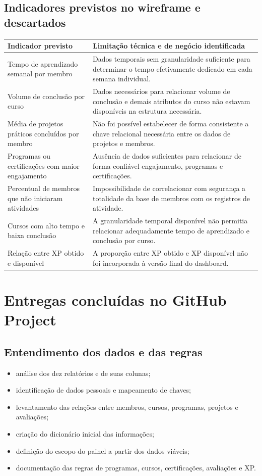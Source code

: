 \documentclass[11pt,a4paper]{article}
\begin{document}
\subsection{Indicadores previstos no wireframe e descartados}

\begin{longtable}{L{56mm}L{90mm}}
\toprule
\textbf{Indicador previsto} & \textbf{Limitação técnica e de negócio identificada} \\
\midrule
\endhead
Tempo de aprendizado semanal por membro & Dados temporais sem granularidade suficiente para determinar o tempo efetivamente dedicado em cada semana individual. \\
\addlinespace
Volume de conclusão por curso & Dados necessários para relacionar volume de conclusão e demais atributos do curso não estavam disponíveis na estrutura necessária. \\
\addlinespace
Média de projetos práticos concluídos por membro & Não foi possível estabelecer de forma consistente a chave relacional necessária entre os dados de projetos e membros. \\
\addlinespace
Programas ou certificações com maior engajamento & Ausência de dados suficientes para relacionar de forma confiável engajamento, programas e certificações. \\
\addlinespace
Percentual de membros que não iniciaram atividades & Impossibilidade de correlacionar com segurança a totalidade da base de membros com os registros de atividade. \\
\addlinespace
Cursos com alto tempo e baixa conclusão & A granularidade temporal disponível não permitia relacionar adequadamente tempo de aprendizado e conclusão por curso. \\
\addlinespace
Relação entre XP obtido e disponível & A proporção entre XP obtido e XP disponível não foi incorporada à versão final do dashboard. \\
\bottomrule
\end{longtable}

\section{Entregas concluídas no GitHub Project}

\subsection{Entendimento dos dados e das regras}

\begin{itemize}
  \item análise dos dez relatórios e de suas colunas;
  \item identificação de dados pessoais e mapeamento de chaves;
  \item levantamento das relações entre membros, cursos, programas, projetos e avaliações;
  \item criação do dicionário inicial das informações;
  \item definição do escopo do painel a partir dos dados viáveis;
  \item documentação das regras de programas, cursos, certificações, avaliações e XP.
\end{itemize}
\end{document}
